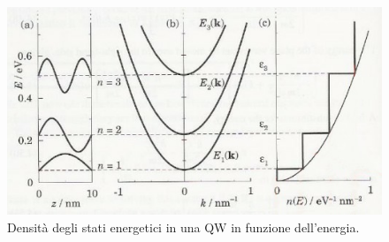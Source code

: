 \begin{figure}[h!]
    \centering
    \includegraphics[width=\linewidth]{Images/QuantumWellDensityOfStates.png}
    \caption{Densità degli stati energetici in una QW in funzione dell'energia.}
    \label{fig:my_label}
\end{figure}